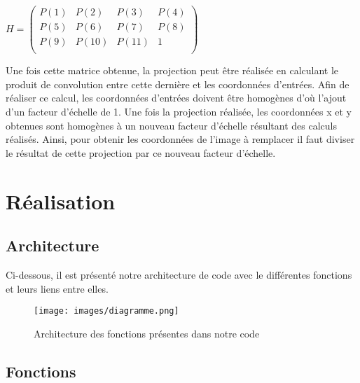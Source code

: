 \documentclass[blue]{ceri/sty/rapport}
\begin{document}
$H = \begin{pmatrix}P(1)&P(2)&P(3)&P(4)\\ 
P(5)&P(6)&P(7)&P(8)\\ 
P(9)&P(10)&P(11)&1\\ 
\end{pmatrix}$ 
\vspace{0.5cm}

Une fois cette matrice obtenue, la projection peut être réalisée en calculant le produit de convolution entre cette dernière et les coordonnées d'entrées. Afin de réaliser ce calcul, les coordonnées d'entrées doivent être homogènes d'où l'ajout d'un facteur d'échelle de 1. 
Une fois la projection réalisée, les coordonnées x et y obtenues sont homogènes à un nouveau facteur d'échelle résultant des calculs réalisés. Ainsi, pour obtenir les coordonnées de l'image à remplacer il faut diviser le résultat de cette projection par ce nouveau facteur d'échelle.

\section{Réalisation}
\label{sec:Réalsiation}

\subsection{Architecture}

Ci-dessous, il est présenté notre architecture de code avec le différentes fonctions et leurs liens entre elles.

\begin{figure}[H]
\centering
\texttt{[image: images/diagramme.png]}
\caption{Architecture des fonctions présentes dans notre code} %
\end{figure}


\subsection{Fonctions}
\label{sec:OptionsClasse4}
\end{document}
